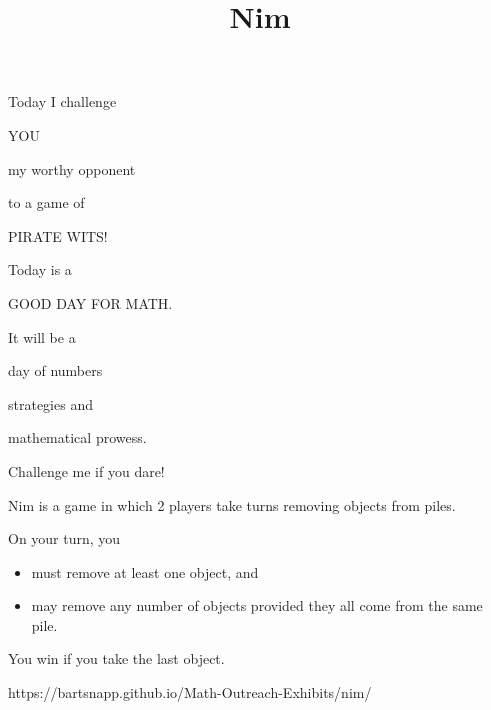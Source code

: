 \documentclass{../exhibit}
\title{Nim}
\begin{document}
\begin{context} Today I challenge


 YOU


 my worthy opponent



 to a game of


 PIRATE WITS!

  

 Today is a


 GOOD DAY FOR MATH.


 It will be a


 \quad day of numbers


  \quad\quad  strategies and


  \quad \quad\quad  mathematical prowess.


  Challenge me if you dare!
\end{context}



\begin{directions}
  Nim is a game in which 2 players take turns removing objects from piles.

  On your turn, you
  \begin{itemize}
    \item must remove at least one object, and
    \item may remove any number of objects provided they all come from the same pile.
  \end{itemize}
  You win if you take the last object.
\end{directions}

\begin{example}
\end{example}

\begin{mathConnections}
  https://bartsnapp.github.io/Math-Outreach-Exhibits/nim/
\end{mathConnections}
\end{document}

